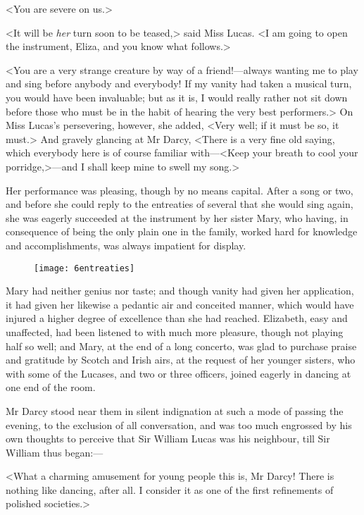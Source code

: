 <You are severe on us.>

<It will be \textit{her} turn soon to be teased,> said Miss Lucas. <I am going to open the instrument, Eliza, and you know what follows.>

<You are a very strange creature by way of a friend!—always wanting me to play and sing before anybody and everybody! If my vanity had taken a musical turn, you would have been invaluable; but as it is, I would really rather not sit down before those who must be in the habit of hearing the very best performers.> On Miss Lucas's persevering, however, she added, <Very well; if it must be so, it must.> And gravely glancing at Mr Darcy, <There is a very fine old saying, which everybody here is of course familiar with—<Keep your breath to cool your porridge,>—and I shall keep mine to swell my song.>

Her performance was pleasing, though by no means capital. After a song or two, and before she could reply to the entreaties of several that she would sing again, she was eagerly succeeded at the instrument by her sister Mary, who having, in consequence of being the only plain one in the family, worked hard for knowledge and accomplishments, was always impatient for display.

\begin{figure}[tbh]
\centering
\texttt{[image: 6entreaties]}
\end{figure}

Mary had neither genius nor taste; and though vanity had given her application, it had given her likewise a pedantic air and conceited manner, which would have injured a higher degree of excellence than she had reached. Elizabeth, easy and unaffected, had been listened to with much more pleasure, though not playing half so well; and Mary, at the end of a long concerto, was glad to purchase praise and gratitude by Scotch and Irish airs, at the request of her younger sisters, who with some of the Lucases, and two or three officers, joined eagerly in dancing at one end of the room.

Mr Darcy stood near them in silent indignation at such a mode of passing the evening, to the exclusion of all conversation, and was too much engrossed by his own thoughts to perceive that Sir William Lucas was his neighbour, till Sir William thus began:—

<What a charming amusement for young people this is, Mr Darcy! There is nothing like dancing, after all. I consider it as one of the first refinements of polished societies.>

